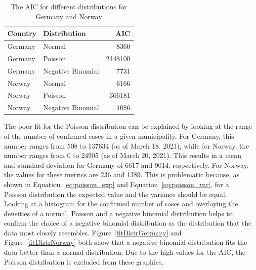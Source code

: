 \begin{table}[H] 
\caption{The AIC for different distributions for Germany and Norway \label{aic}}
\begin{tabular}{l l r}
\toprule
\textbf{Country}	& \textbf{Distribution}	& \textbf{AIC} \\
\midrule
Germany & Normal & 8360 \\
Germany & Poisson & 2148100 \\
Germany & Negative Binomial & 7731 \\
Norway & Normal & 6166 \\
Norway & Poisson & 366181 \\
Norway & Negative Binomial & 4086 \\
\bottomrule
\end{tabular}
\end{table} 
The poor fit for the Poisson distribution can be explained by looking at the range of the number of confirmed cases in a given municipality. For Germany, this number ranges from 508 to 137634 (as of March 18, 2021), while for Norway, the number ranges from 0 to 24905 (as of March 20, 2021). This results in a mean and standard deviation for Germany of 6617 and 9014, respectively. For Norway, the values for these metrics are 236 and 1389. This is problematic because, as shown in Equation~\ref{eq:poisson_exp} and Equation~\ref{eq:poisson_var}, for a Poisson distribution the expected value and the variance should be equal. \\
Looking at a histogram for the confirmed number of cases and overlaying the densities of a normal, Poisson and a negative binomial distribution helps to confirm the choice of a negative binomial distribution as the distribution that the data most closely resembles. Figure~\ref{fitDistrGermany} and Figure~\ref{fitDistrNorway} both show that a negative binomial distribution fits the data better than a normal distribution. Due to the high values for the AIC, the Poisson distribution is excluded from these graphics.
%     
